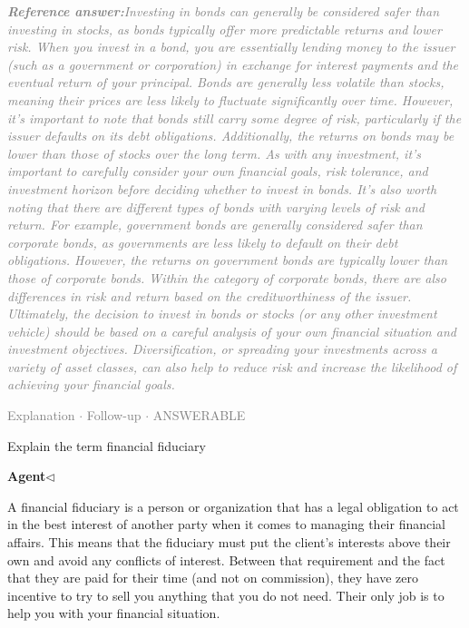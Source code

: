 \documentclass[a4paper,11pt]{article}
\begin{document}
\begin{refanswerenv}
{\footnotesize\textit{\textcolor{gray}{\textbf{Reference answer:}\enspace Investing in bonds can generally be considered safer than investing in stocks, as bonds typically offer more predictable returns and lower risk. When you invest in a bond, you are essentially lending money to the issuer (such as a government or corporation) in exchange for interest payments and the eventual return of your principal. Bonds are generally less volatile than stocks, meaning their prices are less likely to fluctuate significantly over time. However, it's important to note that bonds still carry some degree of risk, particularly if the issuer defaults on its debt obligations. Additionally, the returns on bonds may be lower than those of stocks over the long term. As with any investment, it's important to carefully consider your own financial goals, risk tolerance, and investment horizon before deciding whether to invest in bonds.
It's also worth noting that there are different types of bonds with varying levels of risk and return. For example, government bonds are generally considered safer than corporate bonds, as governments are less likely to default on their debt obligations. However, the returns on government bonds are typically lower than those of corporate bonds. Within the category of corporate bonds, there are also differences in risk and return based on the creditworthiness of the issuer.
Ultimately, the decision to invest in bonds or stocks (or any other investment vehicle) should be based on a careful analysis of your own financial situation and investment objectives. Diversification, or spreading your investments across a variety of asset classes, can also help to reduce risk and increase the likelihood of achieving your financial goals.}}}
\end{refanswerenv}
\vspace{0.5em}
\hfill{\tiny\textcolor{gray}{Explanation $\cdot$ Follow-up $\cdot$ ANSWERABLE}}
\begin{userbubble}
Explain the term financial fiduciary
\end{userbubble}
\noindent\hfill{\small\textcolor{agentcolor}{\textbf{Agent\enspace$\triangleleft$}}}
\begin{agentbubble}
A financial fiduciary is a person or organization that has a legal obligation to act in the best interest of another party when it comes to managing their financial affairs. This means that the fiduciary must put the client's interests above their own and avoid any conflicts of interest. Between that requirement and the fact that they are paid for their time (and not on commission), they have zero incentive to try to sell you anything that you do not need. Their only job is to help you with your financial situation.
\end{agentbubble}
\end{document}

